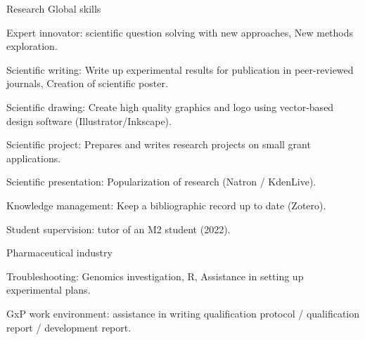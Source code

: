

\begin{cventries}

  \cventry
    {Research} %
    {Global skills} %
    {} %
    {} %
    {
      \begin{cvitems} %
        \item {Expert innovator: scientific question solving with new approaches, New methods exploration.}
        \item {Scientific writing: Write up experimental results for publication in peer-reviewed journals, Creation of scientific poster.}
        \item {Scientific drawing: Create high quality graphics and logo using vector-based design software (Illustrator/Inkscape).}
        \item {Scientific project: Prepares and writes research projects on small grant applications.}
        \item {Scientific presentation: Popularization of research (Natron / KdenLive).}
        \item {Knowledge management: Keep a bibliographic record up to date (Zotero).}
        \item {Student supervision: tutor of an M2 student (2022).}
      \end{cvitems}
    }
    
  \cventry
    {Pharmaceutical industry} %
    {} %
    {} %
    {} %
    {
      \begin{cvitems} %
        \item {Troubleshooting: Genomics investigation, R, Assistance in setting up experimental plans.}
        \item {GxP work environment: assistance in writing qualification protocol / qualification report / development report.}
      \end{cvitems}
    }



\end{cventries}
